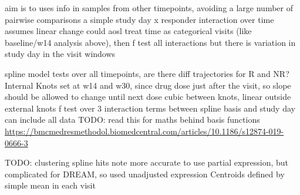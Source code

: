 \begin{outline}

\1 aim is to uses info in samples from other timepoints, avoiding a large number of pairwise comparisons
    \2 a simple study day x responder interaction over time assumes linear change
\1 could aosl treat time as categorical visits (like baseline/w14 analysis above), then f test all interactions
    \2 but there is variation in study day in the visit windows

\1 spline model tests over all timepoints, are there diff trajectories for R and NR?
    \2 Internal Knots set at w14 and w30, since drug dose just after the visit, so slope should be allowed to change until next dose
    \2 cubic between knots, linear outside external knots
    \2 f test over 3 interaction terms between spline basis and study day
        \3 can include all data
        \3 TODO: read this for maths behind basis functions \url{https://bmcmedresmethodol.biomedcentral.com/articles/10.1186/s12874-019-0666-3}


\1 TODO: clustering spline hits
    \2 note more accurate to use partial expression, but complicated for DREAM, so used unadjusted expression
    \2 Centroids defined by simple mean in each visit


\end{outline}
